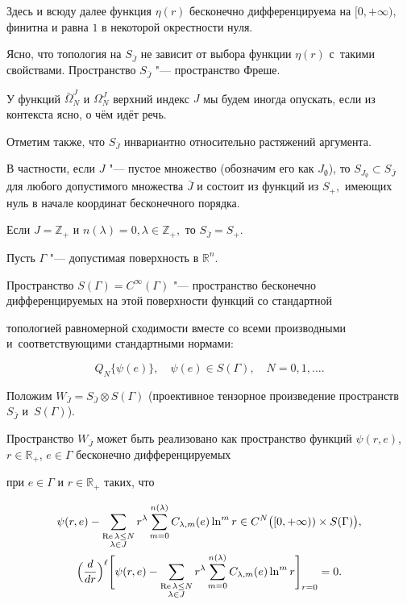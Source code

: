 Здесь и всюду далее функция $\eta(r)$ бесконечно дифференцируема на $[0,+\infty),$ финитна и равна $1$ в некоторой окрестности нуля.

Ясно, что топология на $S_{\bar{J}}$ не зависит от выбора функции $\eta(r)$ с~такими свойствами. Пространство $S_{\bar{J}}$ "--- пространство Фреше.



У функций $\bar{\Omega}_N^J$ и $\Omega_N^J$ верхний индекс $J$ мы будем иногда опускать, если из контекста ясно, о чём идёт речь.

Отметим также, что $S_{\bar{J}}$ инвариантно относительно растяжений аргумента.

В частности, если $J$ "--- пустое множество (обозначим его как $J_{\emptyset}$), то $S_{J_{\emptyset}} \subset S_{\bar{J}}$ для любого допустимого множества $\bar{J}$ и состоит из функций из $S_{+},$ имеющих нуль в начале координат бесконечного порядка. 

Если $J=\mathbb Z_{+}$ и $n(\lambda)=0,\lambda \in \mathbb Z_{+},$ то $S_{\bar{J}}=S_{+}.$ 



Пусть $\Gamma$ "--- допустимая поверхность в $\mathbb R^n.$

Пространство $S(\Gamma)=C^{\infty}(\Gamma)$ "--- пространство бесконечно дифференцируемых на этой поверхности функций со стандартной

топологией равномерной сходимости вместе со всеми производными и~соответствующими стандартными нормами:

$$ Q_N\{ \psi(e)\},\quad \psi(e) \in S(\Gamma),\quad N=0, 1, \dots.$$



Положим $W_{\bar{J}}=S_{\bar{J}} \otimes S(\Gamma)$ (проективное тензорное произведение пространств $S_{\bar{J}}$ и~$S(\Gamma)$).

Пространство $W_{\bar{J}}$ может быть реализовано как пространство функций $\psi(r,e)$, $r\in \mathbb R_{+}$, $e\in \Gamma$ бесконечно дифференцируемых

при $e\in \Gamma$ и $r\in \mathbb R_{+}$ таких, что

\begin{gather*}

\psi(r,e)- \sum\limits_{\substack{  {\rm Re\,} \lambda \leq N\\ \lambda \in J } }r^{\lambda}\sum_{m=0}^{n(\lambda)}C_{\lambda,m}(e)\ln^m r

\in C^N\bigl( [0,+\infty))\times S(\Gamma) \bigr),\\

 \Bigr(\frac{d}{dr}\Bigl)^{\ell} \Biggl[\psi(r,e)- \sum\limits_{\substack{  {\rm Re\,} \lambda \leq N\\ \lambda \in J } }

r^{\lambda}\sum_{m=0}^{n(\lambda)}C_{\lambda,m}(e)\ln^m r\Biggr]_{r=0}

=0.

\end{gather*}

